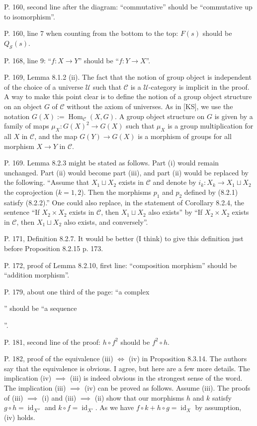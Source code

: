 \documentclass[12pt]{article}
\theoremstyle{remark}
\newcommand{\n}{\noindent}
\newcommand{\C}{\mathcal C}
\newcommand{\U}{\mathcal U}
\DeclareMathOperator{\id}{id}
\DeclareMathOperator{\Hom}{Hom}
\begin{document}
\n P. 160, second line after the diagram: ``commutative'' should be ``commutative up to isomorphism''.

\n P. 160, line 7 when counting from the bottom to the top: $F(s)$ should be $Q_{\mathcal S}(s)$. 

\n P. 168, line 9: ``$f:X\to Y$'' should be ``$f:Y\to X$''. 

\n P. 169, Lemma 8.1.2 (ii). The fact that the notion of group object is independent of the choice of a universe $\U$ such that $\C$ is a $\U$-category is implicit in the proof. A way to make this point clear is to define the notion of a group object structure on an object $G$ of $\C$ without the axiom of universes. As in [KS], we use the notation $G(X):=\Hom_\C(X,G)$. A group object structure on $G$ is given by a family of maps $\mu_X:G(X)^2\to G(X)$ such that $\mu_X$ is a group multiplication for all $X$ in $\C$, and the map $G(Y)\to G(X)$ is a morphism of groups for all morphism $X\to Y$ in $\C$. 

\n P. 169. Lemma 8.2.3 might be stated as follows. Part (i) would remain unchanged. Part (ii) would become part (iii), and part (ii) would be replaced by the following. ``Assume that $X_1\sqcup X_2$ exists in $\C$ and denote by $i_k:X_k\to X_1\sqcup X_2$ the coprojection ($k=1,2$). Then the morphisms $p_1$ and $p_2$ defined by (8.2.1) satisfy (8.2.2).'' One could also replace, in the statement of Corollary 8.2.4, the sentence ``If $X_2\times X_2$ exists in $\C$, then $X_1\sqcup X_2$ also exists'' by ``If $X_2\times X_2$ exists in $\C$, then $X_1\sqcup X_2$ also exists, and conversely''. 

\n P. 171, Definition 8.2.7. It would be better (I think) to give this definition just before Proposition 8.2.15 p. 173. 

\n P. 172, proof of Lemma 8.2.10, first line: ``composition morphism'' should be ``addition morphism''. 

\n P. 179, about one third of the page: ``a complex 
'' 
should be ``a sequence 
''.

\n P. 181, second line of the proof: $h\circ f^2$ should be $f^2\circ h$.  

\n P. 182, proof of the equivalence (iii) $\iff$ (iv) in Proposition 8.3.14. The authors say that the equivalence is obvious. I agree, but here are a few more details. The implication (iv) $\implies$ (iii) is indeed obvious in the strongest sense of the word. The implication (iii) $\implies$ (iv) can be proved as follows. Assume (iii). The proofs of (iii) $\implies$ (i) and (iii) $\implies$ (ii) show that our morphisms $h$ and $k$ satisfy $g\circ h=\id_{X''}$ and $k\circ f=\id_{X'}$. As we have $f\circ k+h\circ g=\id_X$ by assumption, (iv) holds. 
\end{document}
